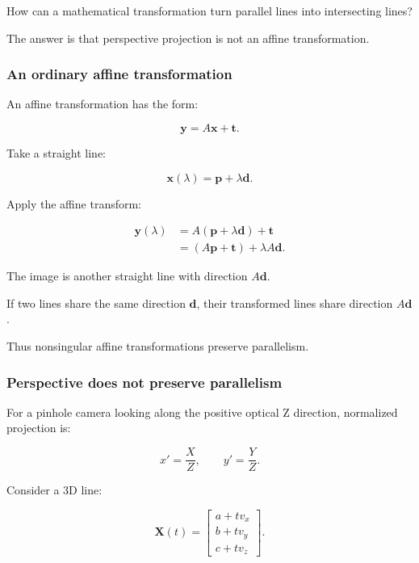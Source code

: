 How can a mathematical transformation turn parallel lines into intersecting lines?

The answer is that perspective projection is not an affine transformation.

\subsubsection{An ordinary affine transformation}\label{02-foundations-ii-ch032-an-ordinary-affine-transformation}

\hypertarget{02-foundations-ii-ch032-an-ordinary-affine-transformation}{}

An affine transformation has the form:

\[
 \boxed{ \mathbf y=A\mathbf x+\mathbf t }.
\]

Take a straight line:

\[
 \mathbf x(\lambda)=\mathbf p+\lambda\mathbf d.
\]

Apply the affine transform:

\[
 \begin{aligned} \mathbf y(\lambda) &= A(\mathbf p+\lambda\mathbf d)+\mathbf t\\ &= (A\mathbf p+\mathbf t)+\lambda A\mathbf d. \end{aligned}
\]

The image is another straight line with direction \(A\mathbf d\).

If two lines share the same direction \(\mathbf d\), their transformed lines share direction \(A\mathbf d\).

Thus nonsingular affine transformations preserve parallelism.

\subsubsection{Perspective does not preserve parallelism}\label{02-foundations-ii-ch032-perspective-does-not-preserve-parallelism}

\hypertarget{02-foundations-ii-ch032-perspective-does-not-preserve-parallelism}{}

For a pinhole camera looking along the positive optical Z direction, normalized projection is:

\[
 \boxed{ x'=\frac XZ,\qquad y'=\frac YZ }.
\]

Consider a 3D line:

\[
 \mathbf X(t)= \begin{bmatrix} a+tv_x\\ b+tv_y\\ c+tv_z \end{bmatrix}.
\]

